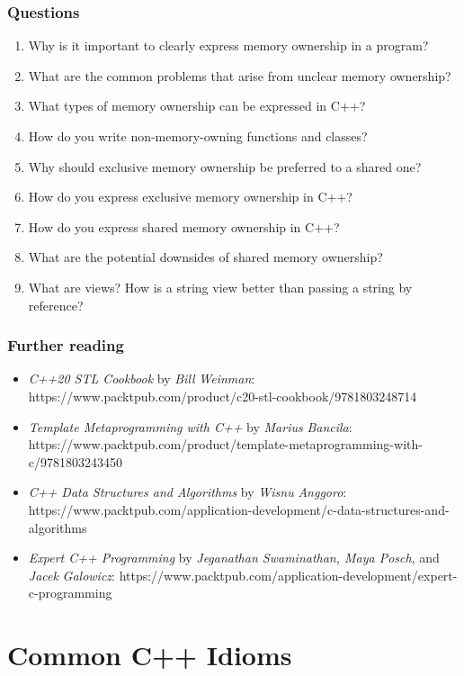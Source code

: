 \section{Questions}

\begin{enumerate}
\item
  Why is it important to clearly express memory ownership in a program?
\item
  What are the common problems that arise from unclear memory ownership?
\item
  What types of memory ownership can be expressed in C++?
\item
  How do you write non-memory-owning functions and classes?
\item
  Why should exclusive memory ownership be preferred to a shared one?
\item
  How do you express exclusive memory ownership in C++?
\item
  How do you express shared memory ownership in C++?
\item
  What are the potential downsides of shared memory ownership?
\item
  What are views? How is a string view better than passing a string by reference?
\end{enumerate}

\section{Further reading}

\begin{itemize}
\item
  \emph{C++20 STL Cookbook} by \emph{Bill} \emph{Weinman}: https://www.packtpub.com/product/c20-stl-cookbook/9781803248714
\item
  \emph{Template Metaprogramming with C++} by \emph{Marius} \emph{Bancila}: https://www.packtpub.com/product/template-metaprogramming-with-c/9781803243450
\item
  \emph{C++ Data Structures and Algorithms} by \emph{Wisnu} \emph{Anggoro}: https://www.packtpub.com/application-development/c-data-structures-and-algorithms
\item
  \emph{Expert C++ Programming} by \emph{Jeganathan Swaminathan, Maya Posch}, and \emph{Jacek} \emph{Galowicz}: https://www.packtpub.com/application-development/expert-c-programming
\end{itemize}


\part{Common C++ Idioms}


